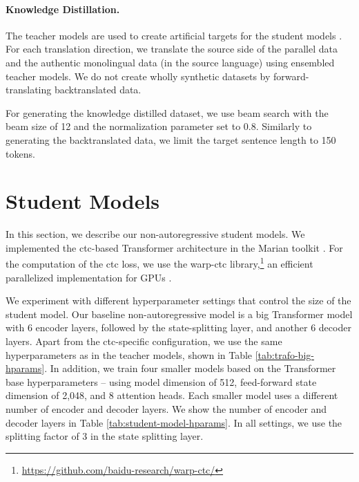 \paragraph{Knowledge Distillation.} The teacher models are used to create
artificial targets for the student models \citep{kim-rush-2016-sequence}. For
each translation direction, we translate the source side of the parallel data
and the authentic monolingual data (in the source language) using ensembled
teacher models. We do not create wholly synthetic datasets by
forward-translating backtranslated data.

For generating the knowledge distilled dataset, we use beam search with the
beam size of 12 and the normalization parameter set to 0.8. Similarly to
generating the backtranslated data, we limit the target sentence length to 150
tokens.


\section{Student Models}%
\label{sec:exp:students}

In this section, we describe our non-autoregressive student models. We
implemented the \acs{ctc}-based Transformer architecture in the Marian toolkit
\citep{junczys-dowmunt-etal-2018-marian}. For the computation of the \ac{ctc}
loss, we use the warp-ctc
library,\footnote{\url{https://github.com/baidu-research/warp-ctc/}} an
efficient parallelized implementation for GPUs \citep{amodei-etal-2016-deep}.

We experiment with different hyperparameter settings that control the size of
the student model. Our baseline non-autoregressive model is a big Transformer
model with 6 encoder layers, followed by the state-splitting layer, and another
6 decoder layers. Apart from the \ac{ctc}-specific configuration, we use the
same hyperparameters as in the teacher models, shown in Table
\ref{tab:trafo-big-hparams}. In addition, we train four smaller models based on
the Transformer base hyperparameters -- using model dimension of 512,
feed-forward state dimension of 2,048, and 8 attention heads. Each smaller
model uses a different number of encoder and decoder layers. We show the number
of encoder and decoder layers in Table \ref{tab:student-model-hparams}. In all
settings, we use the splitting factor of 3 in the state splitting layer.

